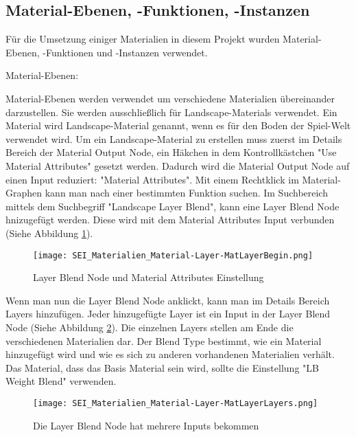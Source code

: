 \subsection{Material-Ebenen, -Funktionen, -Instanzen}
\label{sec:mat_lay_func_ins}

Für die Umsetzung einiger Materialien in diesem Projekt wurden Material-Ebenen, -Funktionen und -Instanzen verwendet.

Material-Ebenen\citep{ue:mat_landscape}:

Material-Ebenen werden verwendet um verschiedene Materialien übereinander darzustellen. Sie werden ausschließlich für
Landscape-Materials verwendet. Ein Material wird Landscape-Material genannt, wenn es für den Boden der Spiel-Welt
verwendet wird. Um ein Landscape-Material zu erstellen muss zuerst im Details Bereich der Material Output Node, ein
Häkchen in dem Kontrollkästchen "Use Material Attributes" gesetzt werden. Dadurch wird die Material Output Node auf
einen Input reduziert: "Material Attributes". Mit einem Rechtklick im Material-Graphen kann man nach einer bestimmten
Funktion suchen. Im Suchbereich mittels dem Suchbegriff "Landscape Layer Blend", kann eine Layer Blend Node hnizugefügt
werden. Diese wird mit dem Material Attributes Input verbunden (Siehe Abbildung \ref{picture:layer_blend}).

\begin{figure}[H]
    \centering
    \texttt{[image: SEI\_Materialien\_Material-Layer-MatLayerBegin.png]}
    \caption{Layer Blend Node und Material Attributes Einstellung}
    \label{picture:layer_blend}
\end{figure}

Wenn man nun die Layer Blend Node anklickt, kann man im Details Bereich Layers hinzufügen. Jeder hinzugefügte Layer
ist ein Input in der Layer Blend Node (Siehe Abbildung \ref{picture:layers}). Die einzelnen Layers stellen am Ende die verschiedenen
Materialien dar. Der Blend Type bestimmt, wie ein Material hinzugefügt wird und wie es sich zu anderen vorhandenen
Materialien verhält. Das Material, dass das Basis Material sein wird, sollte die Einstellung "LB Weight Blend"
verwenden.

\begin{figure}[H]
    \centering
    \texttt{[image: SEI\_Materialien\_Material-Layer-MatLayerLayers.png]}
    \caption{Die Layer Blend Node hat mehrere Inputs bekommen}
    \label{picture:layers}
\end{figure}

